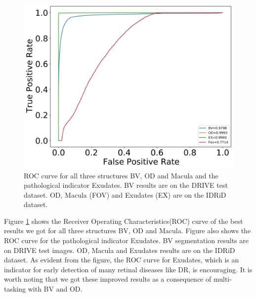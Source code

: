 \documentclass[utf8]{FrontiersinHarvard} %
\begin{document}
\begin{figure}[ht!]
\begin{center}
\includegraphics[width=15cm]{images/roc_all.jpg} %
\end{center}
\caption{ROC curve for all three structures BV, OD and Macula and the pathological indicator Exudates. BV results are on the DRIVE test dataset. OD, Macula (FOV) and Exudates (EX) are on the IDRiD dataset.
}
\label{fig:roc_auc}
\end{figure}

Figure \ref{fig:roc_auc} shows the Receiver Operating Characteristics(ROC) curve of the best results we got for all three structures BV, OD and Macula. Figure also shows the ROC curve for the pathological indicator Exudates. BV segmentation results are on DRIVE test images. OD, Macula and Exudates results are on the IDRiD dataset. As evident from the figure, the ROC curve for Exudates, which is an indicator for early detection of many retinal diseases like DR, is encouraging. It is worth noting that we got these improved results as a consequence of multi-tasking with BV and OD.
\end{document}
